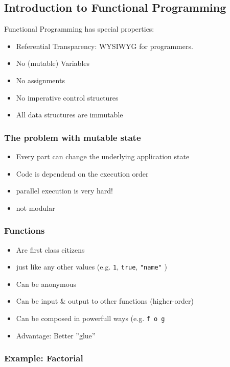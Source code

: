 \subsection{Introduction to Functional Programming}
Functional Programming has special properties:

\begin{itemize}
	\item Referential Transparency: WYSIWYG for programmers.
	\item No (mutable) Variables
	\item No assignments
	\item No imperative control structures
	\item All data structures are immutable
\end{itemize}

\subsubsection{The problem with mutable state}
\begin{itemize}
	\item Every part can change the underlying application state
	\item Code is dependend on the execution order
	\item parallel execution is very hard!
	\item not modular
\end{itemize}

\subsubsection{Functions}

\begin{itemize}
	\item Are first class citizens
	\item just like any other values (e.g. \lstinline|1|, \lstinline|true|, \lstinline|"name"| )
	\item Can be anonymous
	\item Can be input \& output to other functions (higher-order)
	\item Can be composed in powerfull ways (e.g. \lstinline|f o g|
	\item Advantage: Better ''glue''
\end{itemize}

\subsubsection{Example: Factorial}


